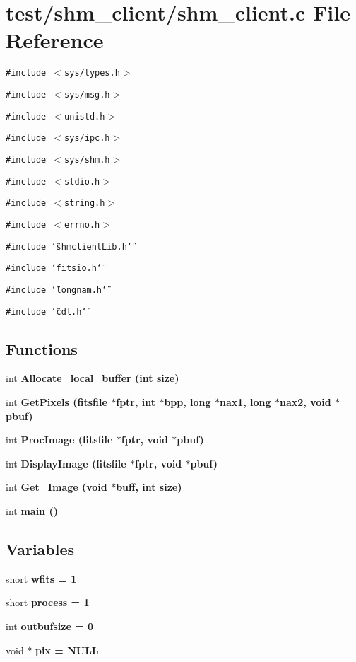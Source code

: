 \section{test/shm\_\-client/shm\_\-client.c File Reference}
\label{shm__client_8c}
{\tt \#include $<$sys/types.h$>$}\par
{\tt \#include $<$sys/msg.h$>$}\par
{\tt \#include $<$unistd.h$>$}\par
{\tt \#include $<$sys/ipc.h$>$}\par
{\tt \#include $<$sys/shm.h$>$}\par
{\tt \#include $<$stdio.h$>$}\par
{\tt \#include $<$string.h$>$}\par
{\tt \#include $<$errno.h$>$}\par
{\tt \#include \char`\"{}shmclient\-Lib.h\char`\"{}}\par
{\tt \#include \char`\"{}fitsio.h\char`\"{}}\par
{\tt \#include \char`\"{}longnam.h\char`\"{}}\par
{\tt \#include \char`\"{}cdl.h\char`\"{}}\par
\subsection*{Functions}
\begin{CompactItemize}
\item 
int \bf{Allocate\_\-local\_\-buffer} (int size)
\item 
int \bf{Get\-Pixels} (\bf{fitsfile} $\ast$fptr, int $\ast$bpp, long $\ast$nax1, long $\ast$nax2, void $\ast$\bf{pbuf})
\item 
int \bf{Proc\-Image} (\bf{fitsfile} $\ast$fptr, void $\ast$\bf{pbuf})
\item 
int \bf{Display\-Image} (\bf{fitsfile} $\ast$fptr, void $\ast$\bf{pbuf})
\item 
int \bf{Get\_\-Image} (void $\ast$buff, int size)
\item 
int \bf{main} ()
\end{CompactItemize}
\subsection*{Variables}
\begin{CompactItemize}
\item 
short \bf{wfits} = 1
\item 
short \bf{process} = 1
\item 
int \bf{outbufsize} = 0
\item 
void $\ast$ \bf{pix} = NULL
\end{CompactItemize}


